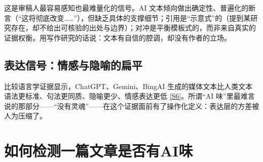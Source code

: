 \documentclass[10pt,a4paper]{ctexart}
\begin{document}
\begin{justifying}
这是审稿人最容易感知也最难量化的信号。AI 文本倾向做出确定性、普遍化的断言（“这将彻底改变……”），但缺乏具体的支撑细节；引用是“示意式”的（提到某研究存在，却不给出可核验的出处与边界）；对冲是平衡模板式的，而非来自真实的证据权衡。用写作研究的话说：文本有自信的腔调，却没有作者的立场。

\subsection{表达信号：情感与隐喻的扁平}

比较语言学证据显示，ChatGPT、Gemini、BingAI 生成的媒体文本比人类文本语法更标准、句法更同质、隐喻更少、情感表达更低 \href{https://hispadoc.es/descarga/articulo/10651021.pdf}{[S6]}。所谓“AI 味”里最难言说的那部分——“没有灵魂”——在这个证据面前有了操作化定义：表达层的方差被人为压缩了。

\end{justifying}

\section{如何检测一篇文章是否有AI味}
\end{document}
